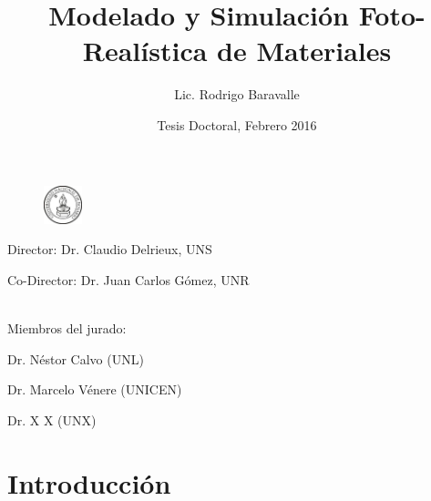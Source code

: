 \documentclass[spanish]{beamer}
\begin{document}
\title
    [Modelado Foto-Realístico de Materiales]{Modelado y Simulación Foto-Realística de Materiales}

\author[Lic. Rodrigo Baravalle]{Lic. Rodrigo Baravalle}
 



\date{Tesis Doctoral, Febrero 2016}

\begin{frame}
\begin{figure}
{\includegraphics[width=0.1\textwidth]{../figures/logounr}}
\end{figure}
\vspace{-1cm}
  \titlepage
\centering
\vspace{-.7cm}
\begin{tiny}
Director: Dr. Claudio Delrieux, UNS

Co-Director: Dr. Juan Carlos Gómez, UNR

\ \\

Miembros del jurado:

Dr. Néstor Calvo (UNL)

Dr. Marcelo Vénere (UNICEN)

Dr. X X (UNX)

\end{tiny}

\end{frame}

\section{Introducción}
\end{document}
